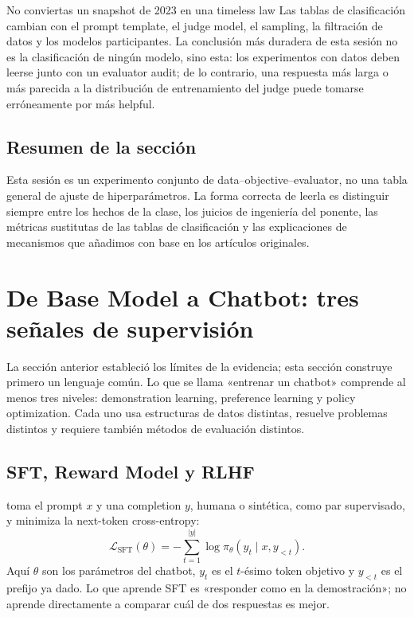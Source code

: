 \documentclass[a4paper]{article}
\begin{document}
\begin{warningbox}{No conviertas un snapshot de 2023 en una timeless law}
Las tablas de clasificación cambian con el prompt template, el judge model, el sampling, la filtración de datos y los modelos participantes. La conclusión más duradera de esta sesión no es la clasificación de ningún modelo, sino esta: los experimentos con datos deben leerse junto con un evaluator audit; de lo contrario, una respuesta más larga o más parecida a la distribución de entrenamiento del judge puede tomarse erróneamente por más helpful.
\end{warningbox}

\subsection{Resumen de la sección}

Esta sesión es un experimento conjunto de data--objective--evaluator, no una tabla general de ajuste de hiperparámetros. La forma correcta de leerla es distinguir siempre entre los hechos de la clase, los juicios de ingeniería del ponente, las métricas sustitutas de las tablas de clasificación y las explicaciones de mecanismos que añadimos con base en los artículos originales.
\section{De Base Model a Chatbot: tres señales de supervisión}

La sección anterior estableció los límites de la evidencia; esta sección construye primero un lenguaje común. Lo que se llama «entrenar un chatbot» comprende al menos tres niveles: demonstration learning, preference learning y policy optimization. Cada uno usa estructuras de datos distintas, resuelve problemas distintos y requiere también métodos de evaluación distintos.

\subsection{SFT, Reward Model y RLHF}

 toma el prompt $x$ y una completion $y$, humana o sintética, como par supervisado, y minimiza la next-token cross-entropy:
\[
\mathcal{L}_{\mathrm{SFT}}(\theta)
=-\sum_{t=1}^{|y|}\log \pi_{\theta}(y_t\mid x,y_{<t}).
\]
Aquí $\theta$ son los parámetros del chatbot, $y_t$ es el $t$-ésimo token objetivo y $y_{<t}$ es el prefijo ya dado. Lo que aprende SFT es «responder como en la demostración»; no aprende directamente a comparar cuál de dos respuestas es mejor.
\end{document}
